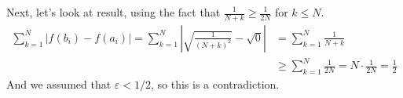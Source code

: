 \documentclass[12pt]{article}
\theoremstyle{plain}
\theoremstyle{definition}
\theoremstyle{remark}
\begin{document}
\begin{enumerate}
\begin{enumerate}
\begin{enumerate}
Next, let's look at result, using the fact that $\frac{1}{N+k} \geq \frac{1}{2N} $ for $k\leq N$. 
\begin{align*}
    \sum_{k=1}^N |f(b_i)-f(a_i)| = \sum_{k=1}^N 
    \left\lvert \sqrt{\frac{1}{(N+k)^2}} - \sqrt{0}\right\rvert
    &= \sum_{k=1}^N {\frac{1}{N+k}}  \\
    &\geq \sum_{k=1}^N {\frac{1}{2N}}  = N\cdot \frac{1}{2N} = \frac{1}{2}
\end{align*}
And we assumed that $\varepsilon<1/2$, so this is a contradiction. 








\end{enumerate} 


\end{enumerate} 


\end{enumerate} 
\end{document}
